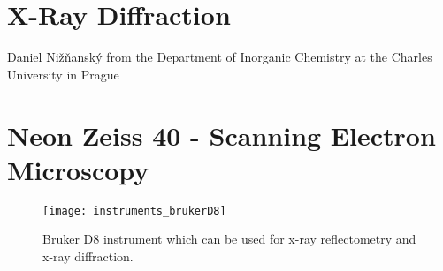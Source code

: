 \documentclass[\main/dresen_thesis.tex]{subfiles}
\begin{document}
\section{X-Ray Diffraction}
\label{app:additionalExperimentalTechniques:xrd}
Daniel Nižňanský from the Department of Inorganic Chemistry at the Charles University in Prague

\section{Neon Zeiss 40 - Scanning Electron Microscopy}
\label{app:additionalExperimentalTechniques:sem}
\begin{figure}[h]
  \centering
  \texttt{[image: instruments\_brukerD8]}
  \caption{\label{fig:appendix:instruments:SEM}Bruker D8 instrument which can be used for x-ray reflectometry and x-ray diffraction.}
\end{figure}
\end{document}
